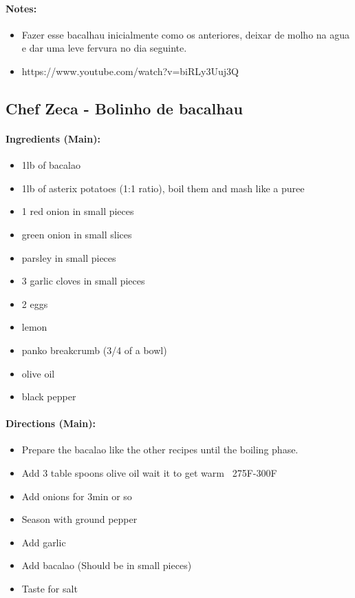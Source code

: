 \documentclass{article}
\begin{document}
\paragraph{Notes:}
\begin{itemize}
    \item Fazer esse bacalhau inicialmente como os anteriores, deixar de molho na agua e dar uma leve fervura no dia seguinte.
    \item https://www.youtube.com/watch?v=biRLy3Uuj3Q
\end{itemize}

\subsection{Chef Zeca - Bolinho de bacalhau} 

\paragraph{Ingredients (Main):}
\begin{itemize}
    \item 1lb of bacalao
    \item 1lb of asterix potatoes (1:1 ratio), boil them and mash like a puree
    \item 1 red onion in small pieces
    \item green onion in small slices
    \item parsley in small pieces
    \item 3 garlic cloves in small pieces
    \item 2 eggs
    \item lemon
    \item panko breakcrumb (3/4 of a bowl)
    \item olive oil
    \item black pepper
\end{itemize}  

\paragraph{Directions (Main):}
\begin{itemize}
    \item Prepare the bacalao like the other recipes until the boiling phase.
    \item Add 3 table spoons olive oil wait it to get warm ~275F-300F
    \item Add onions for 3min or so
    \item Season with ground pepper
    \item Add garlic
    \item Add bacalao (Should be in small pieces)
    \item Taste for salt
\end{itemize}  
\end{document}
